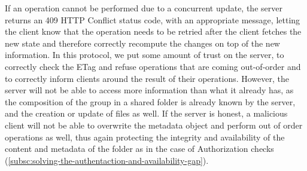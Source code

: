 If an operation cannot be performed due to a concurrent update, the server returns an 409 HTTP Conflict status code, with an appropriate message, 
letting the client know that the operation needs to be retried after the client fetches the new state and therefore correctly recompute the changes on top of the new information.
In this protocol, we put some amount of trust on the server, to correctly check the ETag and refuse operations that are coming out-of-order 
and to correctly inform clients around the result of their operations.
However, the server will not be able to access more information than what it already has,
as the composition of the group in a shared folder is already known by the server, and the creation or update of files as well.
If the server is honest, a malicious client will not be able to overwrite the metadata object and perform out of order operations as well,
thus again protecting the integrity and availability of the content and metadata of the folder as in the case of Authorization checks (\cref{subsc:solving-the-authentaction-and-availability-gap}).

